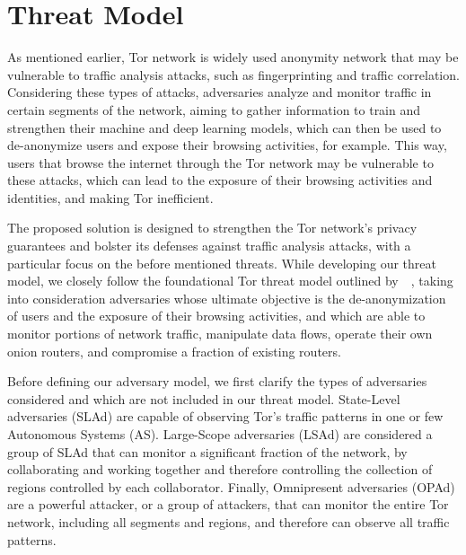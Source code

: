 \section{Threat Model}\label{sec:threat_model}

As mentioned earlier, Tor network is widely used anonymity network that may be vulnerable to traffic analysis attacks, such as fingerprinting and traffic correlation. Considering these types of attacks, adversaries analyze and monitor traffic in certain segments of the network, aiming to gather information to train and strengthen their machine and deep learning models, which can then be used to de-anonymize users and expose their browsing activities, for example. This way, users that browse the internet through the Tor network may be vulnerable to these attacks, which can lead to the exposure of their browsing activities and identities, and making Tor inefficient. 

The proposed solution is designed to strengthen the Tor network's privacy guarantees and bolster its defenses against traffic analysis attacks, with a particular focus on the before mentioned threats. While developing our threat model, we closely follow the foundational Tor threat model outlined by~\autocite{dingledine2004tor}~\cite{dingledine2004tor}, taking into consideration adversaries whose ultimate objective is the de-anonymization of users and the exposure of their browsing activities, and which are able to monitor portions of network traffic, manipulate data flows, operate their own onion routers, and compromise a fraction of existing routers.

Before defining our adversary model, we first clarify the types of adversaries considered and which are not included in our threat model. State-Level adversaries (SLAd) are capable of observing Tor's traffic patterns in one or few Autonomous Systems (AS). Large-Scope adversaries (LSAd) are considered a group of SLAd that can monitor a significant fraction of the network, by collaborating and working together and therefore controlling the collection of regions controlled by each collaborator. Finally, Omnipresent adversaries (OPAd) are a powerful attacker, or a group of attackers, that can monitor the entire Tor network, including all segments and regions, and therefore can observe all traffic patterns.

